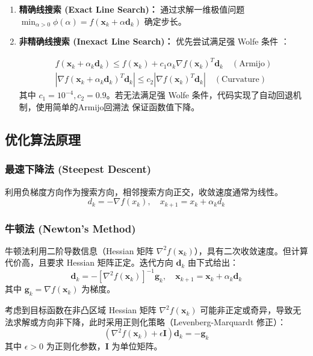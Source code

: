 \documentclass[a4paper,12pt]{article}
\begin{document}
\begin{enumerate}
    \item \textbf{精确线搜索 (Exact Line Search)：}
    通过求解一维极值问题 $\min_{\alpha > 0} \phi(\alpha) = f(\bm{x}_k + \alpha \bm{d}_k)$ 确定步长。
    \item \textbf{非精确线搜索 (Inexact Line Search)：}
    优先尝试满足强 Wolfe 条件 ：

    \begin{gather}
    f(\bm{x}_k + \alpha_k \bm{d}_k) \le f(\bm{x}_k) + c_1 \alpha_k \nabla f(\bm{x}_k)^T \bm{d}_k \quad (\text{Armijo}) \\
    |\nabla f(\bm{x}_k + \alpha_k \bm{d}_k)^T \bm{d}_k| \le c_2 |\nabla f(\bm{x}_k)^T \bm{d}_k| \quad (\text{Curvature})
    \end{gather}
    其中 $c_1=10^{-4}, c_2=0.9$。若无法满足强 Wolfe 条件，代码实现了自动回退机制，使用简单的Armijo回溯法 保证函数值下降。
\end{enumerate}
\subsection{优化算法原理}
\subsubsection{最速下降法 (Steepest Descent)}
利用负梯度方向作为搜索方向，相邻搜索方向正交，收敛速度通常为线性。
\begin{equation}
    d_k = -\nabla f(x_k), \quad x_{k+1} = x_k + \alpha_k d_k
\end{equation}

\subsubsection{牛顿法 (Newton's Method)}
牛顿法利用二阶导数信息（Hessian 矩阵 $\nabla^2 f(\bm{x}_k)$），具有二次收敛速度。但计算代价高，且要求 Hessian 矩阵正定。迭代方向 $\bm{d}_k$ 由下式给出：
\begin{equation}
    \bm{d}_k = -[\nabla^2 f(\bm{x}_k)]^{-1} \bm{g}_k, \quad \bm{x}_{k+1} = \bm{x}_k + \alpha_k \bm{d}_k
\end{equation}
其中 $\bm{g}_k = \nabla f(\bm{x}_k)$ 为梯度。

考虑到目标函数在非凸区域 Hessian 矩阵 $\nabla^2 f(\bm{x}_k)$ 可能非正定或奇异，导致无法求解或方向非下降，此时采用正则化策略（Levenberg-Marquardt 修正）：
\begin{equation}
    (\nabla^2 f(\bm{x}_k) + \epsilon \bm{I}) \bm{d}_k = -\bm{g}_k
\end{equation}
其中 $\epsilon > 0$ 为正则化参数，$\bm{I}$ 为单位矩阵。
\end{document}
